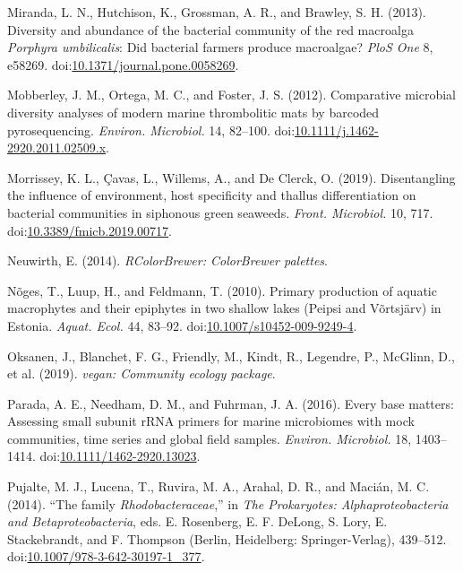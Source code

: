 \documentclass[12pt,]{article}
\begin{document}
\leavevmode\hypertarget{ref-Miranda2013}{}%
Miranda, L. N., Hutchison, K., Grossman, A. R., and Brawley, S. H.
(2013). Diversity and abundance of the bacterial community of the red
macroalga \emph{Porphyra umbilicalis}: Did bacterial farmers produce
macroalgae? \emph{PloS One} 8, e58269.
doi:\href{https://doi.org/10.1371/journal.pone.0058269}{10.1371/journal.pone.0058269}.

\leavevmode\hypertarget{ref-Mobberley2012}{}%
Mobberley, J. M., Ortega, M. C., and Foster, J. S. (2012). Comparative
microbial diversity analyses of modern marine thrombolitic mats by
barcoded pyrosequencing. \emph{Environ. Microbiol.} 14, 82--100.
doi:\href{https://doi.org/10.1111/j.1462-2920.2011.02509.x}{10.1111/j.1462-2920.2011.02509.x}.

\leavevmode\hypertarget{ref-Morrissey2019}{}%
Morrissey, K. L., Çavas, L., Willems, A., and De Clerck, O. (2019).
Disentangling the influence of environment, host specificity and thallus
differentiation on bacterial communities in siphonous green seaweeds.
\emph{Front. Microbiol.} 10, 717.
doi:\href{https://doi.org/10.3389/fmicb.2019.00717}{10.3389/fmicb.2019.00717}.

\leavevmode\hypertarget{ref-Neuwirth2014}{}%
Neuwirth, E. (2014). \emph{RColorBrewer: ColorBrewer palettes}.

\leavevmode\hypertarget{ref-Noges2010}{}%
Nõges, T., Luup, H., and Feldmann, T. (2010). Primary production of
aquatic macrophytes and their epiphytes in two shallow lakes (Peipsi and
Võrtsjärv) in Estonia. \emph{Aquat. Ecol.} 44, 83--92.
doi:\href{https://doi.org/10.1007/s10452-009-9249-4}{10.1007/s10452-009-9249-4}.

\leavevmode\hypertarget{ref-Oksanen2019}{}%
Oksanen, J., Blanchet, F. G., Friendly, M., Kindt, R., Legendre, P.,
McGlinn, D., et al. (2019). \emph{vegan: Community ecology package}.

\leavevmode\hypertarget{ref-Parada2016}{}%
Parada, A. E., Needham, D. M., and Fuhrman, J. A. (2016). Every base
matters: Assessing small subunit rRNA primers for marine microbiomes
with mock communities, time series and global field samples.
\emph{Environ. Microbiol.} 18, 1403--1414.
doi:\href{https://doi.org/10.1111/1462-2920.13023}{10.1111/1462-2920.13023}.

\leavevmode\hypertarget{ref-Pujalte2014}{}%
Pujalte, M. J., Lucena, T., Ruvira, M. A., Arahal, D. R., and Macián, M.
C. (2014). ``The family \emph{Rhodobacteraceae},'' in \emph{The
Prokaryotes: Alphaproteobacteria and Betaproteobacteria}, eds. E.
Rosenberg, E. F. DeLong, S. Lory, E. Stackebrandt, and F. Thompson
(Berlin, Heidelberg: Springer-Verlag), 439--512.
doi:\href{https://doi.org/10.1007/978-3-642-30197-1_377}{10.1007/978-3-642-30197-1\_377}.
\end{document}
